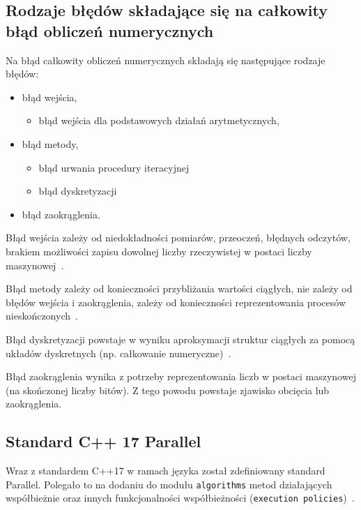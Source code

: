 \documentclass[wi]{zut}
\begin{document}
\subsection{Rodzaje błędów składające się na całkowity błąd obliczeń numerycznych}
Na błąd całkowity obliczeń numerycznych składają się następujące rodzaje błędów:
\begin{itemize}
    \item błąd wejścia,
    \begin{itemize}
        \item błąd wejścia dla podstawowych działań arytmetycznych, 
    \end{itemize}
    \item błąd metody,
    \begin{itemize}
        \item błąd urwania procedury iteracyjnej
        \item błąd dyskretyzacji
    \end{itemize}
    \item błąd zaokrąglenia.
\end{itemize}

Błąd wejścia zależy od niedokładności pomiarów, przeoczeń, błędnych odczytów, brakiem możliwości zapisu dowolnej liczby rzeczywistej w postaci liczby maszynowej~\cite{Piela_Wstep}.

Błąd metody zależy od konieczności przybliżania wartości ciągłych, nie zależy od błędów wejścia i zaokrąglenia, zależy od konieczności reprezentowania procesów nieskończonych~\cite{Piela_Wstep}.

Błąd dyskretyzacji powstaje w wyniku aproksymacji struktur ciągłych za pomocą układów dyskretnych (np. całkowanie numeryczne)~\cite{Piela_Wstep}.

Błąd zaokrąglenia wynika z potrzeby reprezentowania liczb w postaci maszynowej (na skończonej liczby bitów). Z tego powodu powstaje zjawisko obcięcia lub zaokrąglenia.

\subsection{Standard C++ 17 Parallel}

Wraz z standardem C++17 w ramach języka został zdefiniowany standard Parallel. Polegało to na dodaniu do modułu \lstinline{algorithms} metod działających współbieżnie oraz innych funkcjonalności współbieżności (\lstinline{execution policies})~\cite{C++17}.
\end{document}
